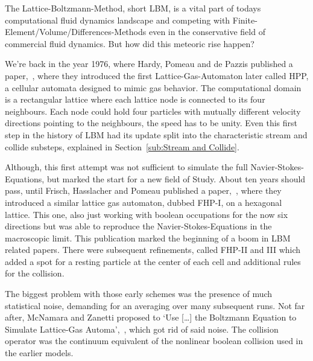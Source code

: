 
The Lattice-Boltzmann-Method, short LBM, is a vital part of todays computational fluid dynamics landscape and competing with Finite-Element/Volume/Differences-Methods even in the conservative field of commercial fluid dynamics. But how did this meteoric rise happen?

We're back in the year 1976, where Hardy, Pomeau and de Pazzis published a paper,~\cite{hardy1976molecular}, where they introduced the first Lattice-Gas-Automaton later called HPP, a cellular automata designed to mimic gas behavior. The computational domain is a rectangular lattice where each lattice node is connected to its four neighbours. Each node could hold four particles with mutually different velocity directions pointing to the neighbours, the speed has to be unity. Even this first step in the history of LBM had its update split into the characteristic stream and collide substeps, explained in Section~\ref{sub:Stream and Collide}.

Although, this first attempt was not sufficient to simulate the full Navier-Stokes-Equations, but marked the start for a new field of Study.
About ten years should pass, until Frisch, Hasslacher and Pomeau published a paper,~\cite{frisch1986lattice}, where they introduced a similar lattice gas automaton, dubbed FHP-I, on a hexagonal lattice. This one, also just working with boolean occupations for the now six directions but was able to reproduce the Navier-Stokes-Equations in the macroscopic limit. This publication marked the beginning of a boom in LBM related papers. There were subsequent refinements, called FHP-II and III which added a spot for a resting particle at the center of each cell and additional rules for the collision.

The biggest problem with those early schemes was the presence of much statistical noise, demanding for an averaging over many subsequent runs. Not far after, McNamara and Zanetti proposed to `Use [\ldots] the Boltzmann Equation to Simulate Lattice-Gas Automa',~\cite{PhysRevLett.61.2332}, which got rid of said noise. The collision operator was the continuum equivalent of the nonlinear boolean collision used in the earlier models.

